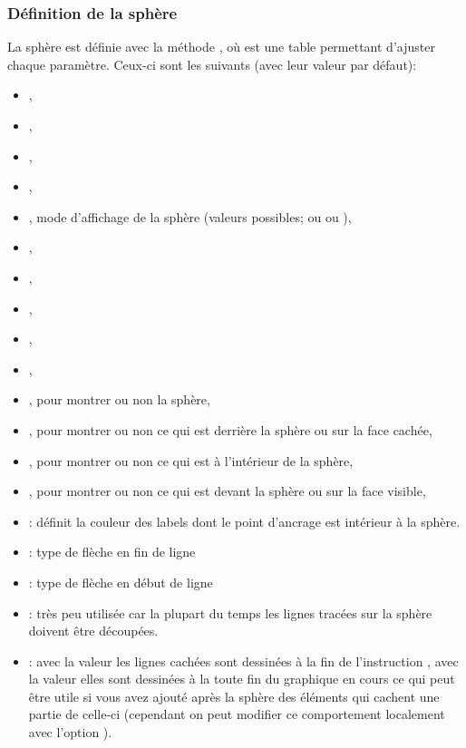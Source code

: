 \subsubsection{Définition de la sphère}

La sphère est définie avec la méthode , où  est une table permettant d'ajuster chaque paramètre. Ceux-ci sont les suivants (avec leur valeur par défaut):

\begin{itemize}
    \item {},
    \item {},
    \item {},
    \item {},
    \item {}, mode d'affichage de la sphère (valeurs possibles;  ou  ou ),
    \item {},
    \item {},
    \item {},
    \item {},
    \item {},
    \item {}, pour montrer ou non la sphère,
    \item {}, pour montrer ou non ce qui est derrière la sphère ou sur la face cachée,
    \item {}, pour montrer ou non ce qui est à l'intérieur de la sphère,
    \item {}, pour montrer ou non ce qui est devant la sphère ou sur la face visible,
    \item {} : définit la couleur des labels dont le point d'ancrage est intérieur à la sphère.
    \item {} : type de flèche en fin de ligne
    \item {} : type de flèche en début de ligne
    \item {} : très peu utilisée car la plupart du temps les lignes tracées sur la sphère doivent être découpées.
    \item {}: avec la valeur \false les lignes cachées sont dessinées à la fin de l'instruction , avec la valeur \true elles sont dessinées à la toute fin du graphique en cours ce qui peut être utile si vous avez ajouté après la sphère des éléments qui cachent une partie de celle-ci (cependant on peut modifier ce comportement localement avec l'option ).
\end{itemize}

